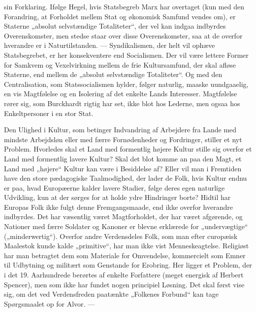 \documentclass[12pt,a4paper,openany]{book}
\newcommand{\opage}[1]{\marginnote{\footnotesize\textit{[#1]}}}
\begin{document}
sin Forklaring. Ifølge Hegel, hvis Statsbegreb Marx har overtaget
(kun med den Forandring, at Forholdet mellem Stat og økonomisk
Samfund vendes om), er Staterne „absolut selvstændige Totaliteter“,
der vel kan indgaa indbyrdes Overenskomster, men stedse staar
over disse Overenskomster, saa at de overfor hverandre er i Naturtilstanden.
--- Syndikalismen, der helt vil ophæve Statsbegrebet, er
her konsekventere end Socialismen. Der vil være lettere Former for
Samkvem og Vexelvirkning mellem de frie Kultursamfund, der skal
afløse Staterne, end mellem de „absolut selvstændige Totaliteter“.
Og med den Centralisation, som Statssocialismen hylder, følger naturlig,
maaske uundgaaelig, en vis Magtfølelse og en Isolering af det
enkelte Lands Interesser. Magtfølelse rører sig, som Burckhardt rigtig
har set, ikke blot hos Lederne, men ogsaa hos Enkeltpersoner i
en stor Stat.

Den Ulighed i Kultur, som betinger Indvandring af Arbejdere fra
Lande med mindste Arbejdsløn eller med færre Fornødenheder og
Fordringer, stiller et nyt Problem. Hvorledes skal et Land med formentlig
højere Kultur stille sig overfor et Land med formentlig lavere
Kultur? Skal det blot komme an paa den Magt, et Land med
„højere“ Kultur kan være i Besiddelse af? Eller vil man i Fremtiden
have den store pædagogiske Taalmodighed, der lader de Folk, hvis
Kultur endnu er paa, hvad Europæerne kalder lavere Stadier, følge
deres egen naturlige Udvikling, kun at der sørges for at holde ydre
Hindringer borte? Hidtil har Europas Folk ikke fulgt denne Fremgangsmaade,
end ikke overfor hverandre indbyrdes. Det har væsentlig
været Magtforholdet, der har været afgørende, og Nationer med
færre Soldater og Kanoner er blevne erklærede for „undervægtige“
(„minderwertig“). Overfor andre Verdensdeles Folk, som man efter
curopæisk Maalestok kunde kalde „primitive“, har man ikke vist
Menneskeagtelse. Religiøst har man betragtet dem som Materiale for
\opage{112}Omvendelse, kommercielt som Emner til Udbytning og militært som
Genstande for Erobring. Her ligger et Problem, der i det 19. Aarhundrede
berørtes af enkelte Forfattere (meget energisk af Herbert
Spencer), men som ikke har fundet nogen principiel Løsning. Det
skal først vise sig, om det ved Verdensfreden paatænkte „Folkenes
Forbund“ kan tage Spørgsmaalet op for Alvor. ---
\end{document}
